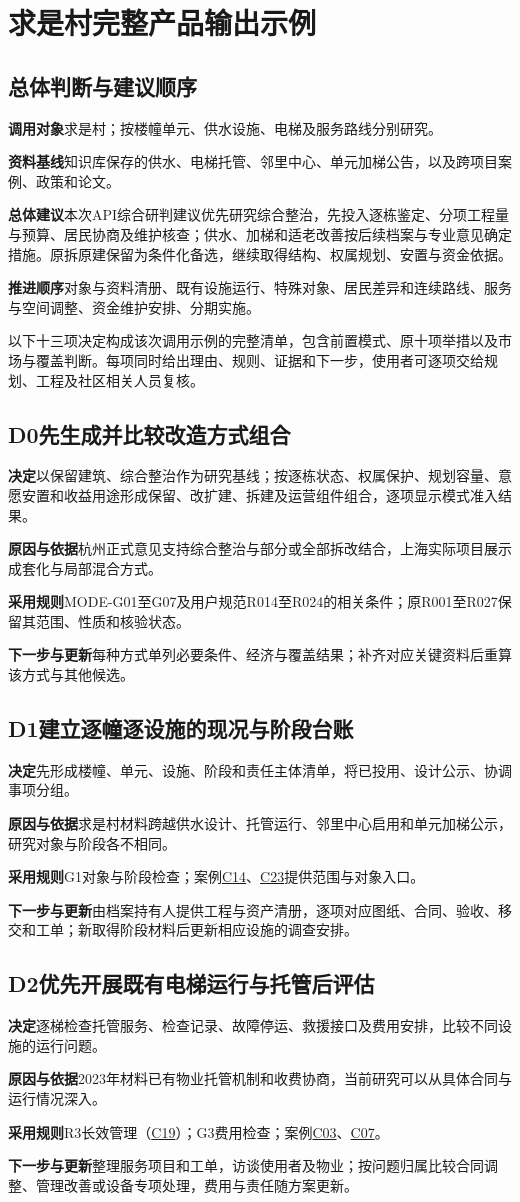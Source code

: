 \documentclass[UTF8,11pt,fontset=windows]{ctexart}
\newcommand{\field}[2]{\par\noindent\textbf{#1}\quad #2\par}
\newcommand{\decision}[2]{\Needspace{7\baselineskip}\subsection*{#1\quad #2}}
\begin{document}
\section{求是村完整产品输出示例}

\subsection{总体判断与建议顺序}

\field{调用对象}{求是村；按楼幢单元、供水设施、电梯及服务路线分别研究。}
\field{资料基线}{知识库保存的供水、电梯托管、邻里中心、单元加梯公告，以及跨项目案例、政策和论文。}
\field{总体建议}{本次API综合研判建议优先研究综合整治，先投入逐栋鉴定、分项工程量与预算、居民协商及维护核查；供水、加梯和适老改善按后续档案与专业意见确定措施。原拆原建保留为条件化备选，继续取得结构、权属规划、安置与资金依据。}
\field{推进顺序}{对象与资料清册、既有设施运行、特殊对象、居民差异和连续路线、服务与空间调整、资金维护安排、分期实施。}

以下十三项决定构成该次调用示例的完整清单，包含前置模式、原十项举措以及市场与覆盖判断。每项同时给出理由、规则、证据和下一步，使用者可逐项交给规划、工程及社区相关人员复核。

\decision{D0}{先生成并比较改造方式组合}
\field{决定}{以保留建筑、综合整治作为研究基线；按逐栋状态、权属保护、规划容量、意愿安置和收益用途形成保留、改扩建、拆建及运营组件组合，逐项显示模式准入结果。}
\field{原因与依据}{杭州正式意见支持综合整治与部分或全部拆改结合，上海实际项目展示成套化与局部混合方式。\cite{hzmode,shmix}}
\field{采用规则}{MODE-G01至G07及用户规范R014至R024的相关条件；原R001至R027保留其范围、性质和核验状态。}
\field{下一步与更新}{每种方式单列必要条件、经济与覆盖结果；补齐对应关键资料后重算该方式与其他候选。}

\decision{D1}{建立逐幢逐设施的现况与阶段台账}
\field{决定}{先形成楼幢、单元、设施、阶段和责任主体清单，将已投用、设计公示、协调事项分组。}
\field{原因与依据}{求是村材料跨越供水设计、托管运行、邻里中心启用和单元加梯公示，研究对象与阶段各不相同。\cite{water,trust,neighbor,elevator}}
\field{采用规则}{G1对象与阶段检查；案例\hyperlink{EXP-8fb43037-0680-4136-8844-edcb789391f4}{C14}、\hyperlink{EXP-1d56715f-f6b6-4e9f-8298-5ce656ee40c5}{C23}提供范围与对象入口。}
\field{下一步与更新}{由档案持有人提供工程与资产清册，逐项对应图纸、合同、验收、移交和工单；新取得阶段材料后更新相应设施的调查安排。}

\decision{D2}{优先开展既有电梯运行与托管后评估}
\field{决定}{逐梯检查托管服务、检查记录、故障停运、救援接口及费用安排，比较不同设施的运行问题。}
\field{原因与依据}{2023年材料已有物业托管机制和收费协商，当前研究可以从具体合同与运行情况深入。\cite{trust}}
\field{采用规则}{R3长效管理（\hyperlink{EXP-6baff473-93ed-4160-9a93-a0abf3c7b092}{C19}）；G3费用检查；案例\hyperlink{EXP-1f50f306-64e5-4335-be56-5c89531c00f2}{C03}、\hyperlink{EXP-3092f687-50c6-452e-b1d1-5703c250c25e}{C07}。}
\field{下一步与更新}{整理服务项目和工单，访谈使用者及物业；按问题归属比较合同调整、管理改善或设备专项处理，费用与责任随方案更新。}
\end{document}
